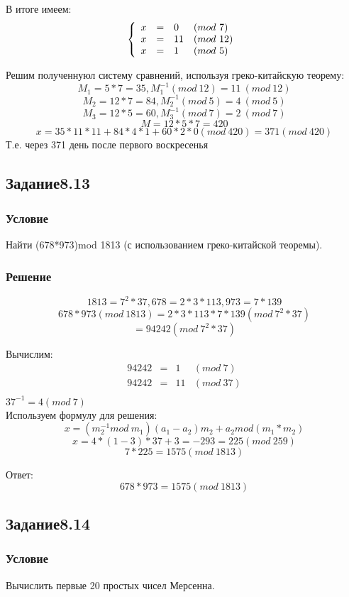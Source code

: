\documentclass[10pt,a4paper]{article}
\begin{document}
В итоге имеем:
\[
\left\{ \begin{array}{llll}
x& = &0 &(mod\ 7)\\
x & = &11 &(mod\ 12)\\
x & = &1 &(mod\ 5)\\
\end{array}
\right. \\
\]

Решим полученнуюл систему сравнений, используя греко-китайскую
теорему:
$$ M_1 = 5 * 7 = 35, M_1^{-1} (mod\ 12) = 11\ (mod\ 12) $$
$$ M_2 = 12 * 7 = 84, M_2^{-1} (mod\ 5) = 4\ (mod\ 5) $$
$$ M_3 = 12 * 5 = 60, M_3^{-1} (mod\ 7) = 2\ (mod\ 7) $$
$$ M = 12 *5 * 7 = 420 $$
$$ x = 35*11*11 + 84*4*1 + 60*2*0 (mod\ 420) = 371 (mod\ 420) $$
Т.е. через 371 день после первого воскресенья


\subsection*{Задание8.13}
\subsubsection*{Условие}
Найти (678*973)mod 1813 (с использованием греко-китайской теоремы).
\subsubsection*{Решение}
$$ 1813 = 7^2 * 37, 678 = 2*3*113, 973 = 7*139 $$
$$ 678*973 (mod\ 1813)  = 2*3*113*7*139 (mod\ 7^2*37) $$
$$ = 94242 (mod\ 7^2*37) $$

Вычислим:
\[
\begin{array}{llll}
94242 & = & 1 &(mod\ 7)\\
94242 & = &11 &(mod\ 37)\\
\end{array}
\]
$ 37^{-1} = 4 (mod\ 7) $ \\
Используем формулу для решения:
$$ x = (m_2^{-1} mod\ m_1)(a_1 - a_2)m_2 + a_2 mod(m_1 * m_2) $$
$$ x = 4*(1 - 3)*37 + 3 =  -293 = 225 (mod\ 259) $$
$$ 7*225 = 1575 (mod\ 1813) $$

Ответ:\\
$$ 678*973 = 1575 (mod\ 1813) $$

\subsection*{Задание8.14}
\subsubsection*{Условие}
Вычислить первые 20 простых чисел Мерсенна.
\end{document}
